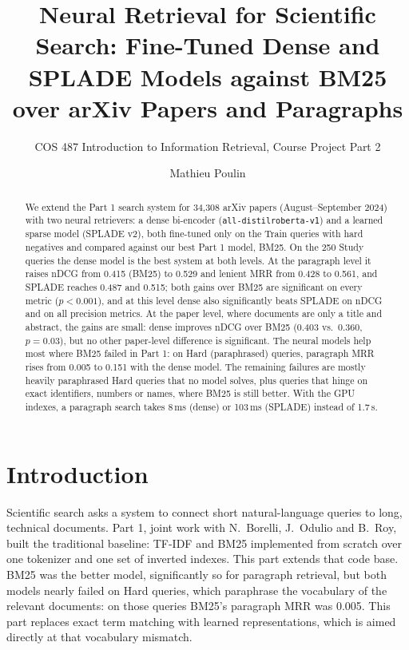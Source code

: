 \documentclass[sigconf,nonacm]{acmart}
\begin{document}
\title{Neural Retrieval for Scientific Search: Fine-Tuned Dense and SPLADE Models against BM25 over arXiv Papers and Paragraphs}

\subtitle{COS 487 Introduction to Information Retrieval, Course Project Part 2}

\author{Mathieu Poulin}

\begin{abstract}
We extend the Part 1 search system for 34{,}308 arXiv papers (August--September 2024) with two neural retrievers: a dense bi-encoder (\texttt{all-distilroberta-v1}) and a learned sparse model (SPLADE v2), both fine-tuned only on the Train queries with hard negatives and compared against our best Part 1 model, BM25. On the 250 Study queries the dense model is the best system at both levels. At the paragraph level it raises nDCG from 0.415 (BM25) to 0.529 and lenient MRR from 0.428 to 0.561, and SPLADE reaches 0.487 and 0.515; both gains over BM25 are significant on every metric ($p<0.001$), and at this level dense also significantly beats SPLADE on nDCG and on all precision metrics. At the paper level, where documents are only a title and abstract, the gains are small: dense improves nDCG over BM25 (0.403 vs.\ 0.360, $p=0.03$), but no other paper-level difference is significant. The neural models help most where BM25 failed in Part 1: on Hard (paraphrased) queries, paragraph MRR rises from 0.005 to 0.151 with the dense model. The remaining failures are mostly heavily paraphrased Hard queries that no model solves, plus queries that hinge on exact identifiers, numbers or names, where BM25 is still better. With the GPU indexes, a paragraph search takes 8\,ms (dense) or 103\,ms (SPLADE) instead of 1.7\,s.
\end{abstract}

\maketitle

\section{Introduction}
Scientific search asks a system to connect short natural-language queries to long, technical documents. Part 1, joint work with N.~Borelli, J.~Odulio and B.~Roy, built the traditional baseline: TF-IDF and BM25 implemented from scratch over one tokenizer and one set of inverted indexes. This part extends that code base. BM25 was the better model, significantly so for paragraph retrieval, but both models nearly failed on Hard queries, which paraphrase the vocabulary of the relevant documents: on those queries BM25's paragraph MRR was 0.005. This part replaces exact term matching with learned representations, which is aimed directly at that vocabulary mismatch.
\end{document}
